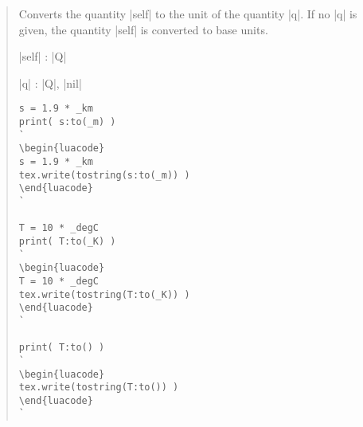 \documentclass{ltxdoc}
\begin{document}
\begin{quote}
  Converts the quantity |self| to the unit of the quantity |q|. If no |q| is given, the quantity |self| is converted to base units.

  \begin{description}
  \item |self| : |Q|

  \item |q| : |Q|, |nil|
  \end{description}

\begin{lstlisting}
s = 1.9 * _km
print( s:to(_m) )
`
\begin{luacode}
s = 1.9 * _km
tex.write(tostring(s:to(_m)) )
\end{luacode}
`

T = 10 * _degC
print( T:to(_K) )
`
\begin{luacode}
T = 10 * _degC
tex.write(tostring(T:to(_K)) )
\end{luacode}
`

print( T:to() )
`
\begin{luacode}
tex.write(tostring(T:to()) )
\end{luacode}
`
\end{lstlisting}

\end{quote}
\end{document}
